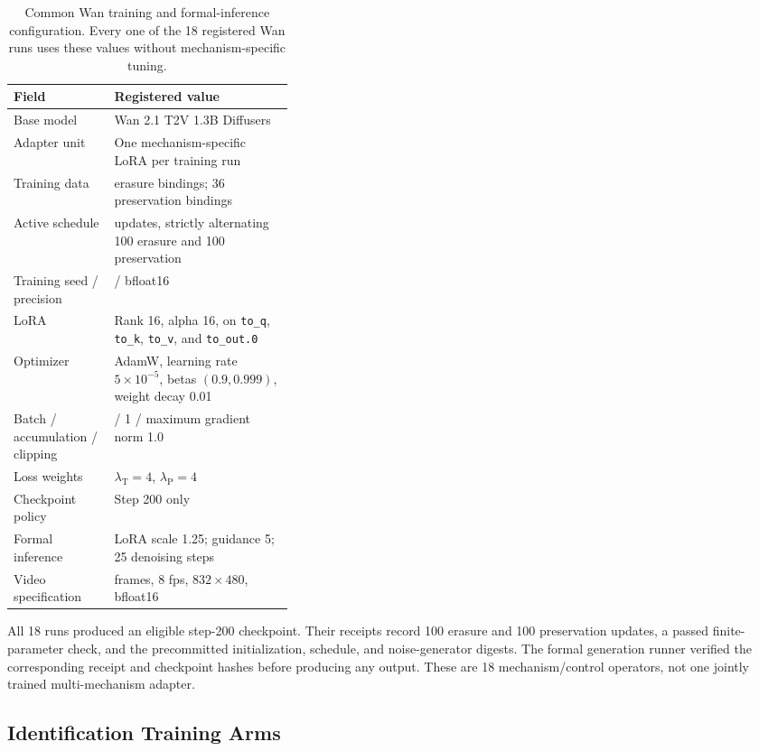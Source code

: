 \begin{table}[H]
  \centering
  \caption{Common Wan training and formal-inference configuration.  Every one
  of the 18 registered Wan runs uses these values without mechanism-specific
  tuning.}
  \label{tab:wan-optimization-config}
  \small
  \begin{tabularx}{\linewidth}{@{}>{\raggedright\arraybackslash}p{0.36\linewidth}>{\raggedright\arraybackslash}X@{}}
    \toprule
    Field & Registered value \\
    \midrule
    Base model & Wan 2.1 T2V 1.3B Diffusers \\
    Adapter unit & One mechanism-specific LoRA per training run \\
    Training data & 178 erasure bindings; 36 preservation bindings \\
    Active schedule & 200 updates, strictly alternating 100 erasure and 100 preservation \\
    Training seed / precision & 26000 / bfloat16 \\
    LoRA & Rank 16, alpha 16, on \texttt{to\_q}, \texttt{to\_k}, \texttt{to\_v}, and \texttt{to\_out.0} \\
    Optimizer & AdamW, learning rate \(5\!\times\!10^{-5}\), betas \((0.9,0.999)\), weight decay 0.01 \\
    Batch / accumulation / clipping & 1 / 1 / maximum gradient norm 1.0 \\
    Loss weights & \(\lambda_{\mathrm T}=4\), \(\lambda_{\mathrm P}=4\) \\
    Checkpoint policy & Step 200 only \\
    Formal inference & LoRA scale 1.25; guidance 5; 25 denoising steps \\
    Video specification & 49 frames, 8 fps, \(832\!\times\!480\), bfloat16 \\
    \bottomrule
  \end{tabularx}
\end{table}

All 18 runs produced an eligible step-200 checkpoint.  Their receipts record
100 erasure and 100 preservation updates, a passed finite-parameter check, and
the precommitted initialization, schedule, and noise-generator digests.  The
formal generation runner verified the corresponding receipt and checkpoint
hashes before producing any output.  These are 18 mechanism/control
operators, not one jointly trained multi-mechanism adapter.

\subsection{Identification Training Arms}
\label{app:identification-arms}

